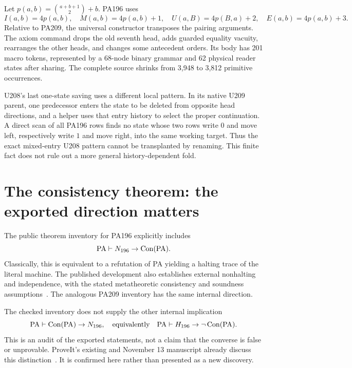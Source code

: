 Let $p(a,b)=\binom{a+b+1}{2}+b$. PA196 uses
\[
 I(a,b)=4p(a,b),\quad M(a,b)=4p(a,b)+1,\quad
 U(a,B)=4p(B,a)+2,\quad E(a,b)=4p(a,b)+3.
\]
Relative to PA209, the universal constructor transposes the pairing
arguments. The axiom command drops the old seventh head, adds guarded
equality vacuity, rearranges the other heads, and changes some antecedent
orders. Its body has 201 macro tokens, represented by a 68-node binary
grammar and 62 physical reader states after sharing. The complete source
shrinks from 3,948 to 3,812 primitive occurrences.

U208's last one-state saving uses a different local pattern. In its native
U209 parent, one predecessor enters the state to be deleted from opposite
head directions, and a helper uses that entry history to select the proper
continuation. A direct scan of all PA196 rows finds no state whose two rows
write $0$ and move left, respectively write $1$ and move right, into the
same working target. Thus the exact mixed-entry U208 pattern cannot be
transplanted by renaming. This finite fact does not rule out a more general
history-dependent fold.

\section{The consistency theorem: the exported direction matters}

The public theorem inventory for PA196 explicitly includes
\begin{equation}\label{eq:known-direction}
 \mathrm{PA}\vdash N_{196}\to\operatorname{Con}(\mathrm{PA}).
\end{equation}
Classically, this is equivalent to a refutation of PA yielding a halting
trace of the literal machine. The published development also establishes
external nonhalting and independence, with the stated metatheoretic
consistency and soundness assumptions~\cite{pa196result,pa196paper}.
The analogous PA209 inventory has the same internal direction.

The checked inventory does not supply the other internal implication
\begin{equation}\label{eq:remaining-direction}
 \mathrm{PA}\vdash\operatorname{Con}(\mathrm{PA})\to N_{196},
 \quad\text{equivalently}\quad
 \mathrm{PA}\vdash H_{196}\to\neg\operatorname{Con}(\mathrm{PA}).
\end{equation}
This is an audit of the exported statements, not a claim that the converse
is false or unprovable. ProveIt's existing  and November
13 manuscript already discuss this distinction~\cite{proveitbridge}.
It is confirmed here rather than presented as a new discovery.

